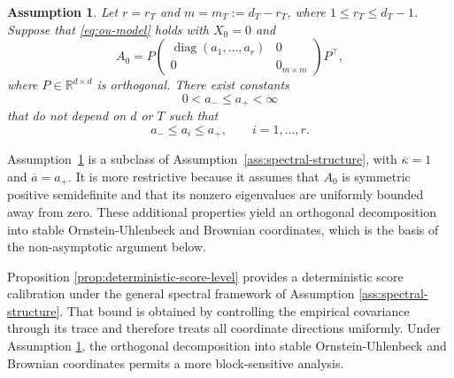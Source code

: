 \documentclass[11pt]{article}
\newtheorem{assumption}[theorem]{Assumption}
\newtheorem{remark}[theorem]{Remark}
\begin{document}
\begin{assumption}%
\label{ass:exact-low-rank}
Let $r=r_T$ and $m=m_T:=d_T-r_T$, where $1\leq r_T\leq d_T-1$. Suppose that
\eqref{eq:ou-model} holds with $X_0=0$ and
\begin{equation}
    A_0
    =P
    \begin{pmatrix}
        \operatorname{diag}(a_1,\ldots,a_r) & 0\\
        0 & 0_{m\times m}
    \end{pmatrix}
    P^\top,
\label{eq:exact-low-rank-drift}
\end{equation}
where $P\in\mathbb R^{d\times d}$ is orthogonal. There exist constants
\begin{equation}
    0<a_-\leq a_+<\infty
\label{eq:exact-low-rank-spectral-bounds}
\end{equation}
that do not depend on $d$ or $T$ such that
\[
    a_-\leq a_i\leq a_+,
    \qquad i=1,\ldots,r.
\]
\end{assumption}

\noindent
Assumption~\ref{ass:exact-low-rank} is a subclass of
Assumption~\ref{ass:spectral-structure}, with $\overline\kappa=1$ and
$\overline a=a_+$. It is more restrictive because it assumes that $A_0$ is
symmetric positive semidefinite and that its nonzero eigenvalues are uniformly
bounded away from zero. These additional properties yield an orthogonal
decomposition into stable Ornstein-Uhlenbeck and Brownian coordinates, which
is the basis of the non-asymptotic argument below.


Proposition \ref{prop:deterministic-score-level} provides a deterministic score calibration under the general
spectral framework of Assumption \ref{ass:spectral-structure}. That bound is obtained by controlling
the empirical covariance through its trace and therefore treats all coordinate
directions uniformly. Under Assumption \ref{ass:exact-low-rank}, the orthogonal decomposition into
stable Ornstein-Uhlenbeck and Brownian coordinates permits a more block-sensitive analysis.
\end{document}
